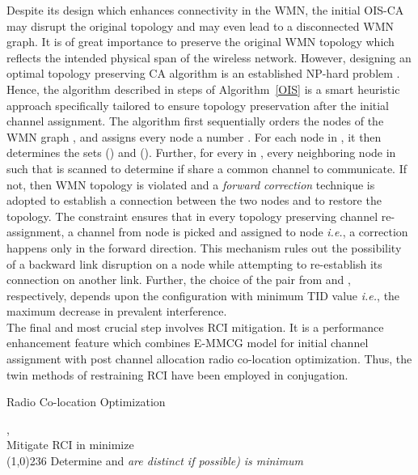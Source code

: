 \documentclass[conference]{IEEEtran}
\begin{document}
Despite its design which enhances connectivity in the WMN, the initial OIS-CA may disrupt the original topology and may even lead to a disconnected WMN graph. It is of great importance to preserve the original WMN topology which reflects the intended physical span of the wireless network. However, designing an optimal topology preserving CA algorithm is an established NP-hard problem \cite{TopoNPHard}. Hence, the algorithm described in steps  of Algorithm~\ref{OIS} is a smart heuristic approach specifically tailored to ensure topology preservation after the initial channel assignment. The algorithm first sequentially orders the nodes of the WMN graph , and assigns every node  a number . For each node  in , it then determines the sets () and (). Further, for every  in , every neighboring node  in  such that  is scanned to determine if    share a common channel to communicate. If not, then WMN topology is violated and a \textit{
forward correction} technique is adopted to establish a connection between the two nodes and to restore the topology. The constraint  ensures that in every topology preserving channel re-assignment, a channel from node  is picked and assigned to node  \emph{i.e.}, a correction happens only in the forward direction. This mechanism rules out the possibility of a backward link disruption on a node while attempting to re-establish its connection on another link. Further, the choice of the  pair from  and , respectively, depends upon the configuration with minimum TID value \emph{i.e.}, the maximum decrease in prevalent interference.\\
The final and most crucial step involves RCI mitigation. It is a performance enhancement feature which combines E-MMCG model for initial channel assignment with post channel allocation radio co-location optimization. Thus, the twin methods of restraining RCI have been employed in conjugation.
\renewcommand{\algorithmicrequire}{\textbf{Input:}}
\renewcommand{\algorithmicensure}{\textbf{Output:}}
\begin{algorithm}[htb!] 
\caption{Radio Co-location Optimization}
\label{radcol}
\begin{algorithmic}[1]
{\fontsize{9}{10}
\REQUIRE,  \\
\ENSURE Mitigate RCI in   minimize  \\
\line(1,0){236}
\FOR {}
\STATE Determine  and  
\ENDFOR
\FOR {}
\IF  { \  \   \ }
\STATE  \textit{are distinct if possible)}   \textit{is minimum}
\ENDIF
\ENDFOR
\FOR {}
\FOR {}
\STATE   {}
\FOR   {}
\IF	{     }
\STATE 	 
\STATE 	
\ENDIF
\ENDFOR
\ENDFOR
\ENDFOR
}
\end{algorithmic}
\end{algorithm}
\end{document}
